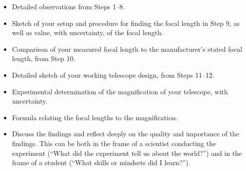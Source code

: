 \begin{itemize}
	\item Detailed observations from Steps 1--8.
	
	\item Sketch of your setup and procedure for finding the focal length in Step 9, as well as value, with uncertainty, of the focal length.
	
	\item Comparison of your measured focal length to the manufacturer's stated focal length, from Step 10.
	
	\item Detailed sketch of your working telescope design, from Steps 11--12.
	
	\item Experimental determination of the magnification of your telescope, with uncertainty.
	
	\item Formula relating the focal lengths to the magnification.
	
	\item Discuss the findings and reflect deeply on the quality and importance of the findings. This can be both in the frame of a scientist conducting the experiment (``What did the experiment tell us about the world?'') and in the frame of a student (``What skills or mindsets did I learn?'').
	
\end{itemize}